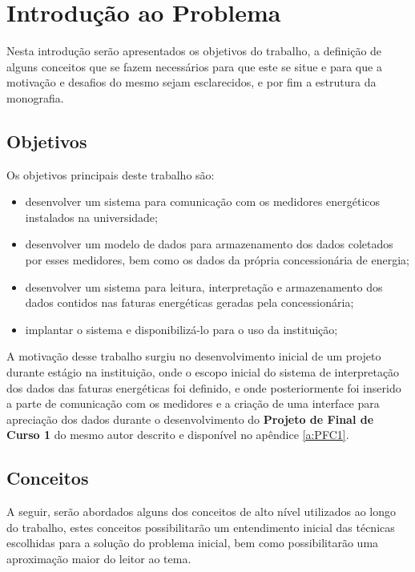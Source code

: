 \chapter[Introdução ao Problema]{Introdução ao Problema}

Nesta introdução serão apresentados os objetivos do trabalho, a definição de alguns conceitos que se fazem necessários para que este se situe e para que a motivação e desafios do mesmo sejam esclarecidos, e por fim a estrutura da monografia.

\section{Objetivos}

Os objetivos principais deste trabalho são:

\begin{itemize}
    \item desenvolver um sistema para comunicação com os medidores energéticos instalados na universidade;
    \item desenvolver um modelo de dados para armazenamento dos dados coletados por esses medidores, bem como os dados da própria concessionária de energia;
    \item desenvolver um sistema para leitura, interpretação e armazenamento dos dados contidos nas faturas energéticas geradas pela concessionária;
    \item implantar o sistema e disponibilizá-lo para o uso da instituição;
\end{itemize}

A motivação desse trabalho surgiu no desenvolvimento inicial de um projeto durante estágio na instituição, onde o escopo inicial do sistema de interpretação dos dados das faturas energéticas foi definido, e onde posteriormente foi inserido a parte de comunicação com os medidores e a criação de uma interface para apreciação dos dados durante o desenvolvimento do \textbf{Projeto de Final de Curso 1} do mesmo autor descrito e disponível no apêndice \ref{a:PFC1}.

\section{Conceitos}

A seguir, serão abordados alguns dos conceitos de alto nível utilizados ao longo do trabalho, estes conceitos possibilitarão um entendimento inicial das técnicas escolhidas para a solução do problema inicial, bem como possibilitarão uma aproximação maior do leitor ao tema.

